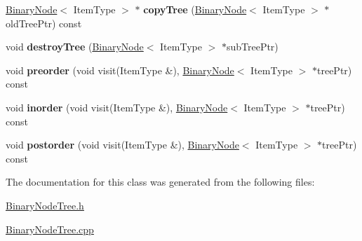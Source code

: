 \begin{DoxyCompactItemize}
\hyperlink{class_binary_node}{Binary\+Node}$<$ Item\+Type $>$ $\ast$ {\bfseries copy\+Tree} (\hyperlink{class_binary_node}{Binary\+Node}$<$ Item\+Type $>$ $\ast$old\+Tree\+Ptr) const
\item 
\hypertarget{class_binary_node_tree_a3a1ed24736793b434d227939b0abd596}{}\label{class_binary_node_tree_a3a1ed24736793b434d227939b0abd596} 
void {\bfseries destroy\+Tree} (\hyperlink{class_binary_node}{Binary\+Node}$<$ Item\+Type $>$ $\ast$sub\+Tree\+Ptr)
\item 
\hypertarget{class_binary_node_tree_af04bfe7d29eb82f8cfa5f812348495da}{}\label{class_binary_node_tree_af04bfe7d29eb82f8cfa5f812348495da} 
void {\bfseries preorder} (void visit(Item\+Type \&), \hyperlink{class_binary_node}{Binary\+Node}$<$ Item\+Type $>$ $\ast$tree\+Ptr) const
\item 
\hypertarget{class_binary_node_tree_a39ccafd824a2142467c00d0a989ddb6b}{}\label{class_binary_node_tree_a39ccafd824a2142467c00d0a989ddb6b} 
void {\bfseries inorder} (void visit(Item\+Type \&), \hyperlink{class_binary_node}{Binary\+Node}$<$ Item\+Type $>$ $\ast$tree\+Ptr) const
\item 
\hypertarget{class_binary_node_tree_a296732b311d2645d697b08076c1e5e28}{}\label{class_binary_node_tree_a296732b311d2645d697b08076c1e5e28} 
void {\bfseries postorder} (void visit(Item\+Type \&), \hyperlink{class_binary_node}{Binary\+Node}$<$ Item\+Type $>$ $\ast$tree\+Ptr) const
\end{DoxyCompactItemize}


The documentation for this class was generated from the following files\+:\begin{DoxyCompactItemize}
\item 
\hyperlink{_binary_node_tree_8h}{Binary\+Node\+Tree.\+h}\item 
\hyperlink{_binary_node_tree_8cpp}{Binary\+Node\+Tree.\+cpp}\end{DoxyCompactItemize}
